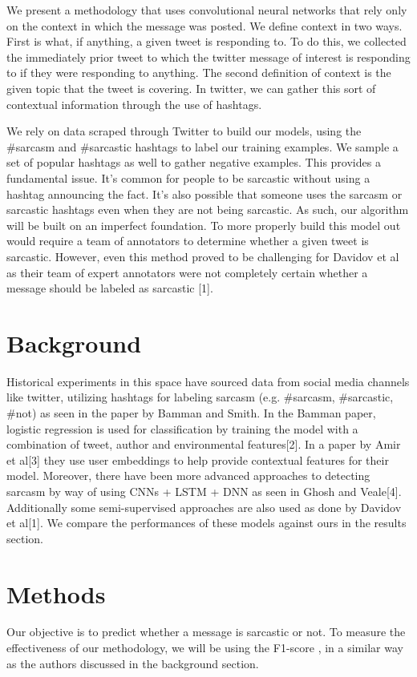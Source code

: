 \documentclass[11pt,a4paper]{article}
\begin{document}
We present a methodology that uses convolutional neural networks that rely only on the context in which the message was posted. We define context in two ways. First is what, if anything, a given tweet is responding to. To do this, we collected the immediately prior tweet to which the twitter message of interest is responding to if they were responding to anything. The second definition of context is the given topic that the tweet is covering. In twitter, we can gather this sort of contextual information through the use of hashtags.

We rely on data scraped through Twitter to build our models, using the \#sarcasm and \#sarcastic hashtags to label our training examples. We sample a set of popular hashtags as well to gather negative examples. This provides a fundamental issue. It's common for people to be sarcastic without using a hashtag announcing the fact. It's also possible that someone uses the sarcasm or sarcastic hashtags even when they are not being sarcastic. As such, our algorithm will  be built on an imperfect foundation. To more properly build this model out would require a team of annotators to determine whether a given tweet is sarcastic. However, even this method proved to be challenging for Davidov et al as their team of expert annotators were not completely certain whether a message should be labeled as sarcastic [1].

\section{Background}

Historical experiments in this space have sourced data from social media channels like twitter, utilizing hashtags for labeling sarcasm (e.g. \#sarcasm, \#sarcastic, \#not) as seen in the paper by Bamman and Smith. In the Bamman paper, logistic regression is used for classification by training the model with a combination of tweet, author and environmental features[2].  In a paper by Amir et al[3] they use user embeddings to help provide contextual features for their model.  Moreover, there have been more advanced approaches to detecting sarcasm by way of using CNNs + LSTM + DNN as seen in Ghosh and Veale[4].  Additionally some semi-supervised approaches are also used as done by Davidov et al[1]. We compare the performances of these models against ours in the results section.

\section{Methods}
Our objective is to predict whether a message is sarcastic or not. To measure the effectiveness of our methodology, we will be using the  F1-score , in a similar way as the authors discussed in the background section. 
\end{document}
